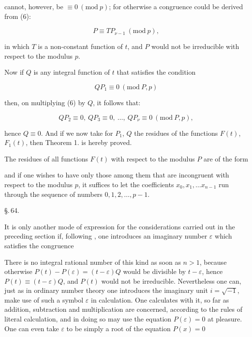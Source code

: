 cannot, however, be $\equiv 0\ (\mathrm{mod}\ p)$; for otherwise a congruence could be derived from (6):

\[
P \equiv T P_{\nu-1}\ (\mathrm{mod}\ p),
\]

in which $T$ is a non-constant function of $t$, and $P$ would not be irreducible with respect to the modulus $p$.

Now if $Q$ is any integral function of $t$ that satisfies the condition

\[
Q P_1 \equiv 0\ (\mathrm{mod}\ P, p)
\]

then, on multiplying (6) by $Q$, it follows that:

\[
Q P_2 \equiv 0,\ Q P_3 \equiv 0,\ \ldots,\ Q P_\nu \equiv 0\ (\mathrm{mod}\ P, p),
\]

hence $Q \equiv 0$. And if we now take for $P_1$, $Q$ the residues of the functions $F(t)$, $F_1(t)$, then Theorem 1. is hereby proved.

The residues of all functions $F(t)$ with respect to the modulus $P$ are of the form


and if one wishes to have only those among them that are incongruent with respect to the modulus $p$, it suffices to let the coefficients $x_0, x_1, \ldots x_{n-1}$ run through the sequence of numbers $0, 1, 2, \ldots, p-1$.


\S.\,64.


It is only another mode of expression for the considerations carried out in the preceding section if, following , one introduces an imaginary number $\varepsilon$ which satisfies the congruence


There is no integral rational number of this kind as soon as $n > 1$, because otherwise $P(t) - P(\varepsilon) = (t-\varepsilon)Q$ would be divisible by $t-\varepsilon$, hence $P(t) \equiv (t-\varepsilon)Q$, and $P(t)$ would not be irreducible. Nevertheless one can, just as in ordinary number theory one introduces the imaginary unit $i = \sqrt{-1}$, make use of such a symbol $\varepsilon$ in calculation. One calculates with it, so far as addition, subtraction and multiplication are concerned, according to the rules of literal calculation, and in doing so may use the equation $P(\varepsilon) = 0$ at pleasure. One can even take $\varepsilon$ to be simply a root of the equation $P(x) = 0$
